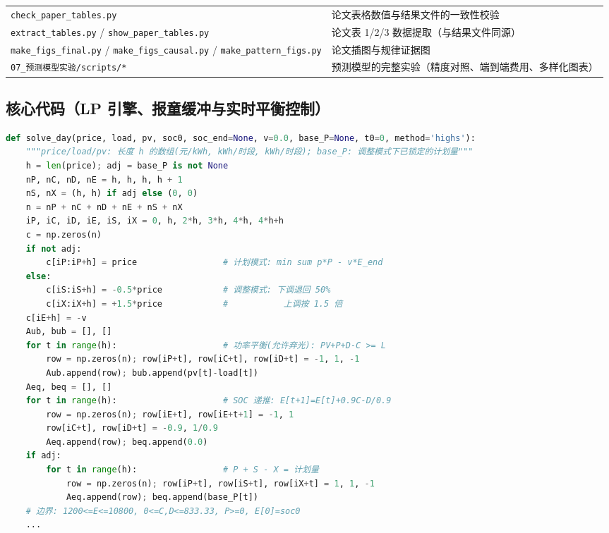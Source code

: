\begin{table}[htbp]
\begin{tabularx}{\textwidth}{@{}p{4.6cm}X@{}}
\texttt{check\_paper\_tables.py} & 论文表格数值与结果文件的一致性校验 \\
\texttt{extract\_tables.py} / \texttt{show\_paper\_tables.py} & 论文表 1/2/3 数据提取（与结果文件同源\nobreak） \\
\texttt{make\_figs\_final.py} / \texttt{make\_figs\_causal.py} / \texttt{make\_pattern\_figs.py} & 论文插图与规律证据图 \\
\texttt{07\_预测模型实验/scripts/*} & 预测模型的完整实验（精度对照\nobreak、端到端费用\nobreak、多样化图表\nobreak） \\
\bottomrule
\end{tabularx}
\end{table}

\subsection{核心代码（LP 引擎\nobreak、报童缓冲与实时平衡控制\nobreak）}

\begin{lstlisting}[language=Python, caption={单日 LP 引擎（节选：计划模式与调整模式的目标、约束装配）}]
def solve_day(price, load, pv, soc0, soc_end=None, v=0.0, base_P=None, t0=0, method='highs'):
    """price/load/pv: 长度 h 的数组(元/kWh, kWh/时段, kWh/时段); base_P: 调整模式下已锁定的计划量"""
    h = len(price); adj = base_P is not None
    nP, nC, nD, nE = h, h, h, h + 1
    nS, nX = (h, h) if adj else (0, 0)
    n = nP + nC + nD + nE + nS + nX
    iP, iC, iD, iE, iS, iX = 0, h, 2*h, 3*h, 4*h, 4*h+h
    c = np.zeros(n)
    if not adj:
        c[iP:iP+h] = price                 # 计划模式: min sum p*P - v*E_end
    else:
        c[iS:iS+h] = -0.5*price            # 调整模式: 下调退回 50%
        c[iX:iX+h] = +1.5*price            #           上调按 1.5 倍
    c[iE+h] = -v
    Aub, bub = [], []
    for t in range(h):                     # 功率平衡(允许弃光): PV+P+D-C >= L
        row = np.zeros(n); row[iP+t], row[iC+t], row[iD+t] = -1, 1, -1
        Aub.append(row); bub.append(pv[t]-load[t])
    Aeq, beq = [], []
    for t in range(h):                     # SOC 递推: E[t+1]=E[t]+0.9C-D/0.9
        row = np.zeros(n); row[iE+t], row[iE+t+1] = -1, 1
        row[iC+t], row[iD+t] = -0.9, 1/0.9
        Aeq.append(row); beq.append(0.0)
    if adj:
        for t in range(h):                 # P + S - X = 计划量
            row = np.zeros(n); row[iP+t], row[iS+t], row[iX+t] = 1, 1, -1
            Aeq.append(row); beq.append(base_P[t])
    # 边界: 1200<=E<=10800, 0<=C,D<=833.33, P>=0, E[0]=soc0
    ...
\end{lstlisting}

